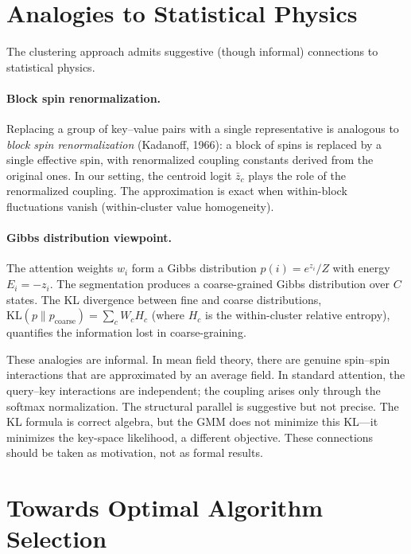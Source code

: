 \documentclass[11pt,a4paper]{article}
\theoremstyle{definition}
\newcommand{\KL}{\mathrm{KL}}
\begin{document}
\section{Analogies to Statistical Physics}\label{sec:physics}

The clustering approach admits suggestive (though informal) connections to
statistical physics.

\paragraph{Block spin renormalization.}
Replacing a group of key--value pairs with a single representative is
analogous to \emph{block spin renormalization} (Kadanoff, 1966): a block of
spins is replaced by a single effective spin, with renormalized coupling
constants derived from the original ones.  In our setting, the centroid logit
$\bar{z}_c$ plays the role of the renormalized coupling.  The approximation
is exact when within-block fluctuations vanish (within-cluster value
homogeneity).

\paragraph{Gibbs distribution viewpoint.}
The attention weights $w_i$ form a Gibbs distribution
$p(i) = e^{z_i}/Z$ with energy $E_i = -z_i$.  The segmentation produces a
coarse-grained Gibbs distribution over $C$ states.  The KL divergence between
fine and coarse distributions,
$\KL(p\|p_{\mathrm{coarse}}) = \sum_c W_c H_c$
(where $H_c$ is the within-cluster relative entropy), quantifies the
information lost in coarse-graining.

\begin{researchnote}
These analogies are informal.  In mean field theory, there are genuine
spin--spin interactions that are approximated by an average field.  In
standard attention, the query--key interactions are independent; the coupling
arises only through the softmax normalization.  The structural parallel is
suggestive but not precise.  The KL formula is correct algebra, but the GMM
does not minimize this KL---it minimizes the key-space likelihood, a
different objective.  These connections should be taken as motivation, not as
formal results.
\end{researchnote}


\section{Towards Optimal Algorithm Selection}\label{sec:selection}
\end{document}
